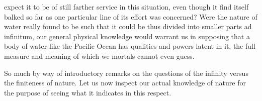 \documentclass[a4paper, 11pt, oneside, polutonikogreek, english]{article}
\begin{document}
expect it to be of still farther service in this situation, even though it find itself balked so far as one particular line of its effort was concerned? Were the nature of water really found to be such that it could be thus divided into smaller parts ad infinitum, our general physical knowledge would warrant us in supposing that a body of water like the Pacific Ocean has qualities and powers latent in it, the full measure and meaning of which we mortals cannot even guess.

So much by way of introductory remarks on the questions of the infinity versus the finiteness of nature. Let us now inspect our actual knowledge of nature for the purpose of seeing what it indicates in this respect.

\subsection{}
\end{document}
